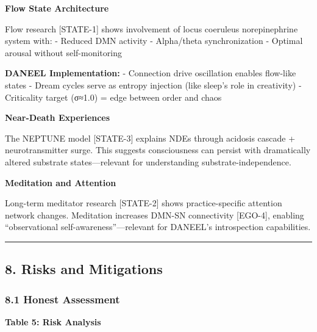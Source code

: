 \documentclass[
  11pt,
]{article}
\begin{document}
\textbf{Flow State Architecture}

Flow research {[}STATE-1{]} shows involvement of locus coeruleus
norepinephrine system with: - Reduced DMN activity - Alpha/theta
synchronization - Optimal arousal without self-monitoring

\textbf{DANEEL Implementation:} - Connection drive oscillation enables
flow-like states - Dream cycles serve as entropy injection (like sleep's
role in creativity) - Criticality target (σ≈1.0) = edge between order
and chaos

\textbf{Near-Death Experiences}

The NEPTUNE model {[}STATE-3{]} explains NDEs through acidosis cascade +
neurotransmitter surge. This suggests consciousness can persist with
dramatically altered substrate states---relevant for understanding
substrate-independence.

\textbf{Meditation and Attention}

Long-term meditator research {[}STATE-2{]} shows practice-specific
attention network changes. Meditation increases DMN-SN connectivity
{[}EGO-4{]}, enabling ``observational self-awareness''---relevant for
DANEEL's introspection capabilities.

\begin{center}\rule{0.5\linewidth}{0.5pt}\end{center}

\subsection{8. Risks and Mitigations}\label{risks-and-mitigations}

\subsubsection{8.1 Honest Assessment}\label{honest-assessment}

\textbf{Table 5: Risk Analysis}
\end{document}
